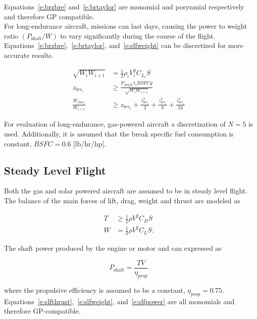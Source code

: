 \documentclass[]{aiaa-tc}%
\begin{document}
    Equations~\ref{e:brzbre} and~\ref{e:brtaylor} are monomial and posynmial respectively and therefore GP compatible. \\
    
    For long-endurance aircraft, missions can last days, causing the power to weight ratio $(P_{\text{shaft}}/W)$ to vary significantly during the course of the flight.  Equations~\ref{e:brzbre},~\ref{e:brtaylor}, and~\ref{e:slfweight} can be discretized for more accurate results.

\begin{align}
    \label{e:slfweightd}
    \sqrt{W_i W_{i+1}} &= \frac{1}{2} \rho_i V_i^2 C_{L_i} S \\
    \label{e:brzbred}
    z_{bre_i} &\geq \frac{P_{shaft_i}t_i BSFC g}{\sqrt{W_i W_{i+1}}}\\
    \label{e:brtaylord}
    \frac{W_{fuel_i}}{W_{i+1}} &\geq z_{bre_i} + \frac{z_{bre_i}^2}{2} + \frac{z_{bre_i}^3}{6} + \frac{z_{bre_i}^3}{24} 
    \end{align}

    For evaluation of long-endurance, gas-powered aircraft a discretization of $N=5$ is used. Additionally, it is assumed that the break specific fuel consumption is constant, $BSFC = 0.6$ [lb/hr/hp].

\subsection{Steady Level Flight}

Both the gas and solar powered aircraft are assumed to be in steady level flight.  The balance of the main forces of lift, drag, weight and thrust are modeled as

\begin{align}
    \label{e:slfthrust}
    T &\geq \frac{1}{2} \rho V^2 C_D S\\
    \label{e:slfweight}
    W &= \frac{1}{2} \rho V^2 C_L S . 
\end{align}

The shaft power produced by the engine or motor and can expressed as  

\begin{equation}
    \label{e:slfpower}
    P_{\text{shaft}} = \frac{TV}{\eta_{prop}}
    \end{equation}

    where the propulsive efficiency is assumed to be a constant, $\eta_{prop} = 0.75$. Equations~\ref{e:slfthrust},~\ref{e:slfweight}, and~\ref{e:slfpower} are all monomials and therefore GP-compatible.
\end{document}
